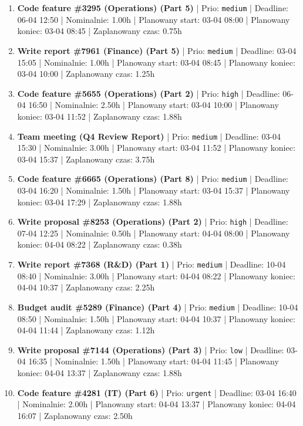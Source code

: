 {\footnotesize
\begin{enumerate}
  \item [\textbf{14645}] \textbf{Code feature \#3295 (Operations) (Part 5)} | Prio: \texttt{medium} | Deadline: 06-04 12:50 | Nominalnie: 1.00h | Planowany start: 03-04 08:00 | Planowany koniec: 03-04 08:45 | Zaplanowany czas: 0.75h
  \item [\textbf{14657}] \textbf{Write report \#7961 (Finance) (Part 5)} | Prio: \texttt{medium} | Deadline: 03-04 15:05 | Nominalnie: 1.00h | Planowany start: 03-04 08:45 | Planowany koniec: 03-04 10:00 | Zaplanowany czas: 1.25h
  \item [\textbf{14626}] \textbf{Code feature \#5655 (Operations) (Part 2)} | Prio: \texttt{high} | Deadline: 06-04 16:50 | Nominalnie: 2.50h | Planowany start: 03-04 10:00 | Planowany koniec: 03-04 11:52 | Zaplanowany czas: 1.88h
  \item [\textbf{14635}] \textbf{Team meeting (Q4 Review Report)} | Prio: \texttt{medium} | Deadline: 03-04 15:30 | Nominalnie: 3.00h | Planowany start: 03-04 11:52 | Planowany koniec: 03-04 15:37 | Zaplanowany czas: 3.75h
  \item [\textbf{14667}] \textbf{Code feature \#6665 (Operations) (Part 8)} | Prio: \texttt{medium} | Deadline: 03-04 16:20 | Nominalnie: 1.50h | Planowany start: 03-04 15:37 | Planowany koniec: 03-04 17:29 | Zaplanowany czas: 1.88h
  \item [\textbf{14614}] \textbf{Write proposal \#8253 (Operations) (Part 2)} | Prio: \texttt{high} | Deadline: 07-04 12:25 | Nominalnie: 0.50h | Planowany start: 04-04 08:00 | Planowany koniec: 04-04 08:22 | Zaplanowany czas: 0.38h
  \item [\textbf{14633}] \textbf{Write report \#7368 (R\&D) (Part 1)} | Prio: \texttt{medium} | Deadline: 10-04 08:40 | Nominalnie: 3.00h | Planowany start: 04-04 08:22 | Planowany koniec: 04-04 10:37 | Zaplanowany czas: 2.25h
  \item [\textbf{14630}] \textbf{Budget audit \#5289 (Finance) (Part 4)} | Prio: \texttt{medium} | Deadline: 10-04 08:50 | Nominalnie: 1.50h | Planowany start: 04-04 10:37 | Planowany koniec: 04-04 11:44 | Zaplanowany czas: 1.12h
  \item [\textbf{14702}] \textbf{Write proposal \#7144 (Operations) (Part 3)} | Prio: \texttt{low} | Deadline: 03-04 16:35 | Nominalnie: 1.50h | Planowany start: 04-04 11:45 | Planowany koniec: 04-04 13:37 | Zaplanowany czas: 1.88h
  \item [\textbf{14604}] \textbf{Code feature \#4281 (IT) (Part 6)} | Prio: \texttt{urgent} | Deadline: 03-04 16:40 | Nominalnie: 2.00h | Planowany start: 04-04 13:37 | Planowany koniec: 04-04 16:07 | Zaplanowany czas: 2.50h

\end{enumerate}}
